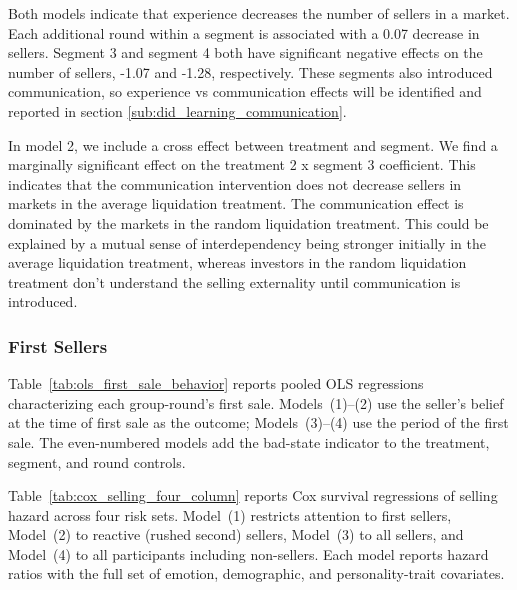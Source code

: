 \documentclass[11pt]{article}
\begin{document}
Both models indicate that experience decreases the number of sellers in a market. Each additional round within a segment is associated with a 0.07 decrease in sellers. 
Segment 3 and segment 4 both have significant negative effects on the number of sellers, -1.07 and -1.28, respectively. These segments also introduced communication,
so experience vs communication effects will be identified and reported in section \ref{sub:did_learning_communication}.

In model 2, we include a cross effect between treatment and segment. We find a marginally significant effect on 
the treatment 2 x segment 3 coefficient. This indicates that the communication intervention does not decrease 
sellers in markets in the average liquidation treatment. The communication effect is dominated by the markets in the 
random liquidation treatment. This could be explained by a mutual sense of interdependency being stronger initially
in the average liquidation treatment, whereas investors in the random liquidation treatment don't understand the selling externality
until communication is introduced. 

\begin{table}[H]
  \centering
  \caption{Tobit regression: number of sellers per group-round, Treatment~2~$\times$~Segment interactions}
  \label{tab:tobit_n_sellers_interactions}
  
\end{table}

\subsubsection{First Sellers}

Table~\ref{tab:ols_first_sale_behavior} reports pooled OLS regressions characterizing each group-round's first sale. Models~(1)--(2) use the seller's belief at the time of first sale as the outcome; Models~(3)--(4) use the period of the first sale. The even-numbered models add the bad-state indicator to the treatment, segment, and round controls.

Table~\ref{tab:cox_selling_four_column} reports Cox survival regressions of selling hazard across four risk sets. Model~(1) restricts attention to first sellers, Model~(2) to reactive (rushed second) sellers, Model~(3) to all sellers, and Model~(4) to all participants including non-sellers. Each model reports hazard ratios with the full set of emotion, demographic, and personality-trait covariates.
\end{document}
